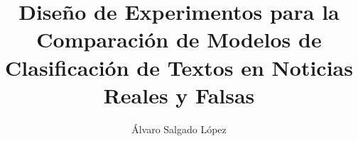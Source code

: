 \documentclass[journal]{IEEEtran}
\begin{document}
%
\title{Diseño de Experimentos para la Comparación de Modelos de Clasificación de Textos en Noticias Reales y Falsas}


\author{Álvaro Salgado López}

% 
%














\maketitle
\end{document}
